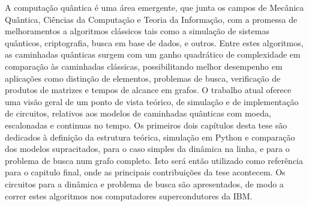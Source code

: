 \documentclass[../../dissertation.tex]{subfiles}
\begin{document}
A computação quântica é uma área emergente, que junta os campos de Mecânica
Quântica, Ciências da Computação e Teoria da Informação, com a promessa de
melhoramentos a algoritmos clássicos tais como a simulação de sistemas
quânticos, criptografia, busca em base de dados, e outros. Entre estes
algoritmos, as caminhadas quânticas surgem com um ganho quadrático de
complexidade em comparação às caminhadas clássicas, possibilitando melhor
desempenho em aplicações como distinção de elementos, problemas de busca,
verificação de produtos de matrizes e tempos de alcance em grafos. O trabalho atual
oferece uma visão geral de um ponto de vista teórico, de simulação e de
implementação de circuitos, relativos aos modelos de caminhadas quânticas com
moeda, escalonadas e continuas no tempo. Os primeiros dois capítulos desta tese
são dedicados à definição da estrutura teórica, simulação em Python e
comparação dos modelos supracitados, para o caso simples da
dinâmica na linha, e para o problema de busca num grafo completo. Isto será
então utilizado como referência para o capitulo final, onde as principais
contribuições da tese acontecem. Os circuitos para a dinâmica e
problema de busca são apresentados, de modo a correr estes algoritmos nos
computadores supercondutores da IBM. 
\end{document}
